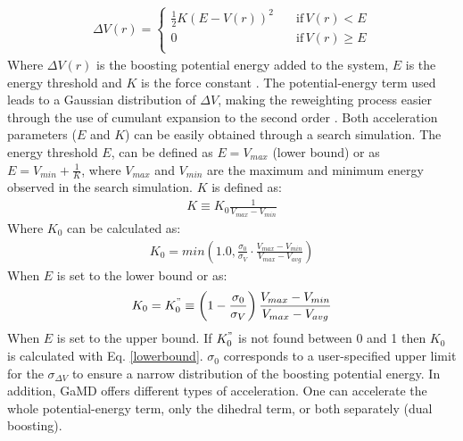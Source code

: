 \begin{equation}
  \begin{aligned}
\Delta V(r) =\begin{cases}
          \frac{1}{2} K \left ( E - V(r) \right )^2 \quad &\text{if} \, V(r) < E \\
          0 \quad &\text{if} \, V(r) \geq E \\
     \end{cases}
  \end{aligned}
\end{equation}
Where $\Delta V(r)$ is the boosting potential energy added to the system, $E$ is the energy threshold and $K$ is the force constant \cite{miao2015gaussian}. The potential-energy term used leads to a Gaussian distribution of $\Delta V$, making the reweighting process easier through the use of cumulant expansion to the second order \cite{miao2014improved}. Both acceleration parameters ($E$ and $K$) can be easily obtained through a search simulation. The energy threshold $E$, can be defined as $E = V_{max}$ (lower bound) or as $E = V_{min} + \frac{1}{K}$, where $V_{max}$ and $V_{min}$ are the maximum and minimum energy observed in the search simulation. $K$ is defined as: 
\begin{equation}
  \begin{aligned}
  K \equiv K_0 \frac{1}{V_{max} - V_{min}}
    \end{aligned}
\end{equation}
Where $K_0$ can be calculated as:
\begin{equation}
\label{lowerbound}
  \begin{aligned}
K_0 = min\left(1.0, \frac{\sigma_0}{\sigma_V} · \frac{V_{max} - V_{min}}{V_{max} - V_{avg}}\right)
    \end{aligned}
\end{equation}
When $E$ is set to the lower bound or as:
\begin{equation}
  \begin{aligned}
K_0 = K_{0}^{"} \equiv \left(1 - \frac{\sigma_0}{\sigma_V}\right)\frac{V_{max} - V_{min}}{V_{max} - V_{avg}}
  \end{aligned}
\end{equation}
When $E$ is set to the upper bound. If $K_{0}^{"}$ is not found between 0 and 1 then $K_0$ is calculated with Eq. \eqref{lowerbound}. $\sigma_0$ corresponds to a user-specified upper limit for the $\sigma_{\Delta V}$ to ensure a narrow distribution of the boosting potential energy. In addition, GaMD offers different types of acceleration. One can accelerate the whole potential-energy term, only the dihedral term, or both separately (dual boosting).

